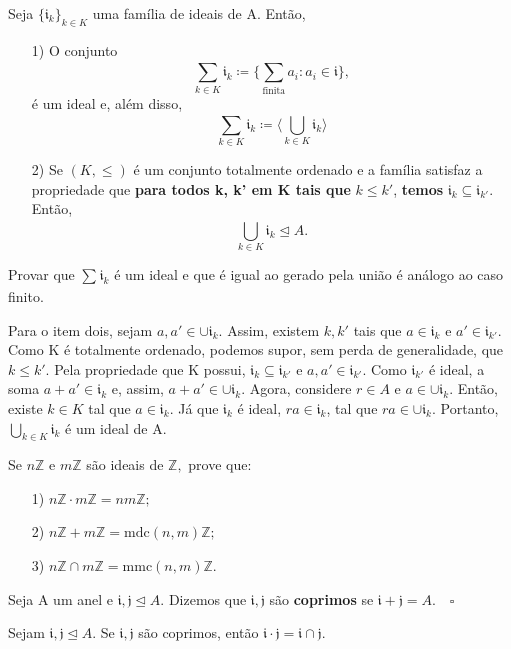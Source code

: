 \documentclass[algebraII_notes.tex]{subfiles}
\begin{document}
\begin{prop*}
	Seja \(\{\mathfrak{i}_{k}\}_{k\in K}\) uma família de ideais de A. Então,
	\begin{itemize}
		\item[1)] O conjunto
		      \[
			      \sum\limits_{k\in K}^{}\mathfrak{i}_{k}\coloneqq \biggl\{\sum\limits_{\text{finita}}^{}a_{i}: a_{i}\in \mathfrak{i}\biggr\},
		      \]
		      é um ideal e, além disso,
		      \[
			      \sum\limits_{k\in K}^{}\mathfrak{i}_{k}\coloneqq \biggl\langle \bigcup_{k\in K}^{}{\mathfrak{i}_{k}} \biggr\rangle
		      \]
		\item[2)] Se \((K,\leq )\) é um conjunto totalmente ordenado e a família satisfaz a propriedade que
		      \textbf{para todos k, k' em K tais que} \(k\leq k'\), \textbf{temos} \(\mathfrak{i}_{k}\subseteq{\mathfrak{i}_{k'}}\). Então,
		      \[
			      \bigcup_{k\in K}^{}{\mathfrak{i}_{k}}\trianglelefteq{A}.
		      \]
	\end{itemize}
	\begin{proof*}
		Provar que \(\sum\limits_{}^{}\mathfrak{i}_{k}\) é um ideal e que é igual ao gerado pela união é análogo ao caso finito.

		Para o item dois, sejam \(a, a'\in \cup \mathfrak{i}_{k}.\) Assim, existem \(k, k'\) tais que \(a\in \mathfrak{i}_{k}\) e \(a'\in \mathfrak{i}_{k'}\).
		Como K é totalmente ordenado, podemos supor, sem perda de generalidade, que \(k\leq k'.\) Pela propriedade que K possui,
		\(\mathfrak{i}_{k}\subseteq{\mathfrak{i}_{k'}}\) e \(a, a'\in \mathfrak{i}_{k'}.\) Como \(\mathfrak{i}_{k'}\) é ideal, a soma
		\(a + a'\in \mathfrak{i}_{k}\) e, assim, \(a + a'\in\cup \mathfrak{i}_{k}.\) Agora, considere \(r\in A\)
		e \(a\in \cup \mathfrak{i}_{k}.\) Então, existe \(k\in K\) tal que \(a\in \mathfrak{i}_{k}\). Já que \(\mathfrak{i}_{k}\)
		é ideal, \(ra\in \mathfrak{i}_{k}\), tal que \(ra\in \cup \mathfrak{i}_{k}.\) Portanto, \(\bigcup_{k\in K}^{}{\mathfrak{i}_{k}}\) é um
		ideal de A. \qedsymbol
	\end{proof*}
\end{prop*}
\begin{example}[Exercício]
	Se \(n \mathbb{Z}\) e \(m \mathbb{Z}\) são ideais de \(\mathbb{Z},\) prove que:
	\begin{itemize}
		\item[1)] \(n \mathbb{Z}\cdot m \mathbb{Z} = nm \mathbb{Z};\)
		\item[2)] \(n \mathbb{Z} + m \mathbb{Z} = \mathrm{mdc}(n, m) \mathbb{Z};\)
		\item[3)] \(n \mathbb{Z}\cap m \mathbb{Z} = \mathrm{mmc}(n, m) \mathbb{Z}.\)
	\end{itemize}
\end{example}
\begin{def*}
	Seja A um anel e \(\mathfrak{i}, \mathfrak{j}\trianglelefteq{A}.\) Dizemos que \(\mathfrak{i}, \mathfrak{j}\) são \textbf{coprimos}
	se \(\mathfrak{i} + \mathfrak{j} = A.\quad\square\)
\end{def*}
\begin{prop*}[Exercício]
	Sejam \(\mathfrak{i}, \mathfrak{j}\trianglelefteq{A}\). Se \(\mathfrak{i}, \mathfrak{j}\) são coprimos, então \(\mathfrak{i}\cdot \mathfrak{j} = \mathfrak{i}\cap \mathfrak{j}.\)
\end{prop*}
\end{document}
